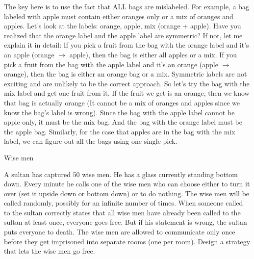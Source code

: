\begin{solution}

The key here is to use the fact that ALL bags are mislabeled. For example, a bag labeled
with apple must contain either oranges only or a mix of oranges and apples. Let's look at
the labels: orange, apple, mix (orange + apple). Have you realized that the orange label
and the apple label are symmetric? If not, let me explain it in detail: If you pick a fruit
from the bag with the orange label and it's an apple (orange $\to$ apple), then the bag is
either all apples or a mix. If you pick a fruit from the bag with the apple label and it's an
orange (apple $\to$ orange), then the bag is either an orange bag or a mix. Symmetric
labels are not exciting and are unlikely to be the correct approach. So let's try the bag
with the mix label and get one fruit from it. If the fruit we get is an orange, then we know
that bag is actually orange (It cannot be a mix of oranges and apples since we know the
bag's label is wrong). Since the bag with the apple label cannot be apple only, it must be
the mix bag. And the bag with the orange label must be the apple bag. Similarly, for the
case that apples are in the bag with the mix label, we can figure out all the bags using one
single pick.

\end{solution}

\begin{problem}{Wise men}

A sultan has captured 50 wise men. He has a glass currently standing bottom down.
Every minute he calls one of the wise men who can choose either to turn it over (set it
upside down or bottom down) or to do nothing. The wise men will be called randomly,
possibly for an infinite number of times. When someone called to the sultan correctly
states that all wise men have already been called to the sultan at least once, everyone
goes free. But if his statement is wrong, the sultan puts everyone to death. The wise men
are allowed to communicate only once before they get imprisoned into separate rooms
(one per room). Design a strategy that lets the wise men go free.
\end{problem}

